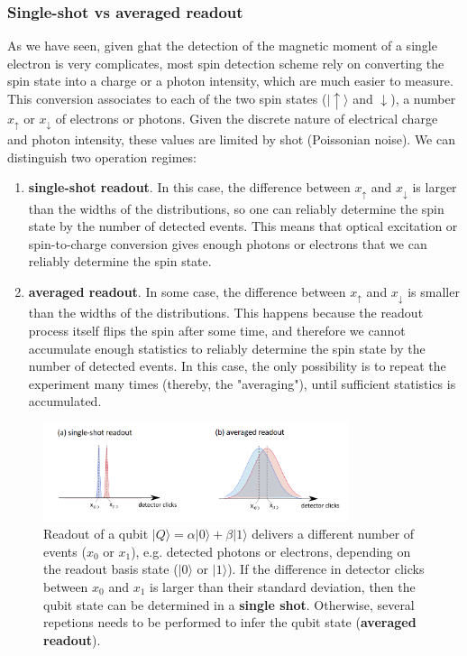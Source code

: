 \documentclass[a4paper,11pt]{article}
\newcommand{\ket}[1]{| #1 \rangle}
\begin{document}
\subsubsection{Single-shot vs averaged readout}
As we have seen, given ghat the detection of the magnetic moment of a single electron is very complicates, most spin detection scheme rely on converting the spin state into a charge or a photon intensity, which are much easier to measure. This conversion associates to each of the two spin states ($\ket{\uparrow}$ and $\downarrow$), a number $x_{\uparrow}$ or $x_{\downarrow}$ of electrons or photons. Given the discrete nature of electrical charge and photon intensity, these values are limited by shot (Poissonian noise). We can distinguish two operation regimes:
\begin{enumerate}
    \item {\bf single-shot readout}. In this case, the difference between $x_{\uparrow}$ and $x_{\downarrow}$ is larger than the widths of the distributions, so one can reliably determine the spin state by the number of detected events. This means that optical excitation or spin-to-charge conversion gives enough photons or electrons that we can reliably determine the spin state.
    \item {\bf averaged readout}. In some case, the difference between $x_{\uparrow}$ and $x_{\downarrow}$ is smaller than the widths of the distributions. This happens because the readout process itself flips the spin after some time, and therefore we cannot accumulate enough statistics to reliably determine the spin state by the number of detected events. In this case, the only possibility is to repeat the experiment many times (thereby, the "averaging"), until sufficient statistics is accumulated.
\end{enumerate}

\begin{figure}[h]
\centering
\includegraphics[width = 0.8\textwidth]{figures/readout_SSRO_AVG.png}
\caption{Readout of a qubit $\ket{Q} = \alpha \ket{0} + \beta \ket{1}$ delivers a different number of events ($x_0$ or $x_1$), e.g. detected photons or electrons, depending on the readout basis state ($\ket{0}$ or $\ket{1}$). If the difference in detector clicks between $x_0$ and $x_1$ is larger than their standard deviation, then the qubit state can be determined in a {\bf single shot}. Otherwise, several repetions needs to be performed to infer the qubit state ({\bf averaged readout}). }
\label{fig:SSRO}
\end{figure}
\end{document}
